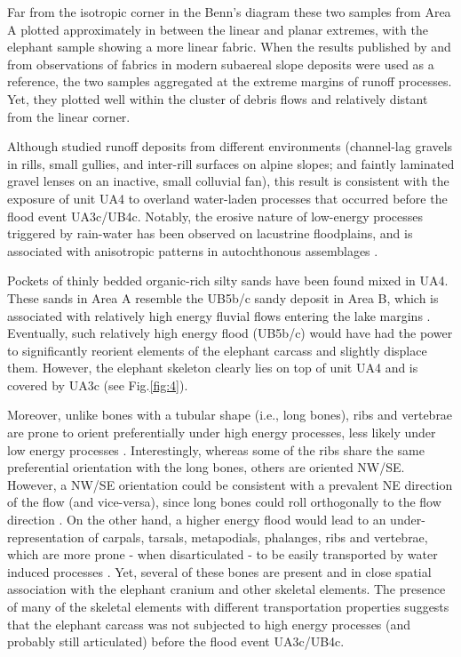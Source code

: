 \documentclass[preprint,authoryear,times]{elsarticle} %
\begin{document}
Far from the isotropic corner in the Benn's diagram these two samples from Area A plotted approximately in between the linear and planar extremes, with the elephant sample showing a more linear fabric. When the results published by \cite{Bertran1997} and \cite{Lenoble2004} from observations of fabrics in modern subaereal slope deposits were used as a reference, the two samples aggregated at the extreme margins of runoff processes. Yet, they plotted well within the cluster of debris flows and relatively distant from the linear corner.

Although \cite{Bertran1997} studied runoff deposits from different environments (channel-lag gravels in rills, small gullies, and inter-rill surfaces on alpine slopes; and faintly laminated gravel lenses on an inactive, small colluvial fan), this result is consistent with the exposure of unit UA4 to overland water-laden processes that occurred before the flood event UA3c/UB4c. Notably, the erosive nature of low-energy processes triggered by rain-water has been observed on lacustrine floodplains, and is associated with anisotropic patterns in autochthonous assemblages \citep{Cobo-Sanchez2014,Dominguez-Rodrigo2014,Garcia-Moreno2016}.

Pockets of thinly bedded organic-rich silty sands have been found mixed in UA4. These sands in Area A resemble the UB5b/c sandy deposit in Area B, which is associated with relatively high energy fluvial flows entering the lake margins \citep{Karkanas}. Eventually, such relatively high energy flood (UB5b/c) would have had the power to significantly reorient elements of the elephant carcass and slightly displace them. However, the elephant skeleton clearly lies on top of unit UA4 and is covered by UA3c (see Fig.\ref{fig:4}).

Moreover, unlike bones with a tubular shape (i.e., long bones), ribs and vertebrae are prone to orient preferentially under high energy processes, less likely under low energy processes \citep{Dominguez-Rodrigo2013,Dominguez-Rodrigo2014}. Interestingly, whereas some of the ribs share the same preferential orientation with the long bones, others are oriented NW/SE. However, a NW/SE orientation could be consistent with a prevalent NE direction of the flow (and vice-versa), since long bones could roll orthogonally to the flow direction \citep{Voorhies1969}. On the other hand, a higher energy flood would lead to an under-representation of carpals, tarsals, metapodials, phalanges, ribs and vertebrae, which are more prone - when disarticulated - to be easily transported by water induced processes \citep{Voorhies1969}. Yet, several of these bones are present and in close spatial association with the elephant cranium and other skeletal elements. The presence of many of the skeletal elements with different transportation properties suggests that the elephant carcass was not subjected to high energy processes (and probably still articulated) before the flood event UA3c/UB4c.
\end{document}
